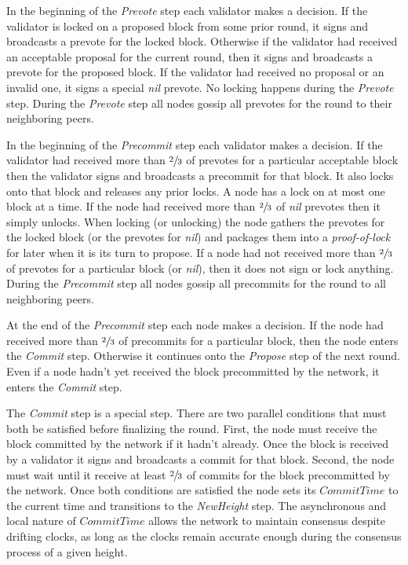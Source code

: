 \documentclass[letter,11pt]{article}
\begin{document}
In the beginning of the \textit{Prevote} step each validator makes a decision. If the validator is locked on a proposed block from some prior round, it signs and broadcasts a prevote for the locked block. Otherwise if the validator had received an acceptable proposal for the current round, then it signs and broadcasts a prevote for the proposed block. If the validator had received no proposal or an invalid one, it signs a special \textit{nil} prevote. No locking happens during the \textit{Prevote} step. During the \textit{Prevote} step all nodes gossip all prevotes for the round to their neighboring peers.

In the beginning of the \textit{Precommit} step each validator makes a decision. If the validator had received more than $\sfrac{2}{3}$ of prevotes for a particular acceptable block then the validator signs and broadcasts a precommit for that block. It also locks onto that block and releases any prior locks. A node has a lock on at most one block at a time. If the node had received more than $\sfrac{2}{3}$ of \textit{nil} prevotes then it simply unlocks. When locking (or unlocking) the node gathers the prevotes for the locked block (or the prevotes for \textit{nil}) and packages them into a \textit{proof-of-lock} for later when it is its turn to propose. If a node had not received more than $\sfrac{2}{3}$ of prevotes for a particular block (or \textit{nil}), then it does not sign or lock anything. During the \textit{Precommit} step all nodes gossip all precommits for the round to all neighboring peers.

At the end of the \textit{Precommit} step each node makes a decision. If the node had received more than $\sfrac{2}{3}$ of precommits for a particular block, then the node enters the \textit{Commit} step. Otherwise it continues onto the \textit{Propose} step of the next round. Even if a node hadn’t yet received the block precommitted by the network, it enters the \textit{Commit} step.

The \textit{Commit} step is a special step. There are two parallel conditions that must both be satisfied before finalizing the round. First, the node must receive the block committed by the network if it hadn’t already. Once the block is received by a validator it signs and broadcasts a commit for that block. Second, the node must wait until it receive at least $\sfrac{2}{3}$ of commits for the block precommitted by the network. Once both conditions are satisfied the node sets its $CommitTime$ to the current time and transitions to the \textit{NewHeight} step. The asynchronous and local nature of $CommitTime$ allows the network to maintain consensus despite drifting clocks, as long as the clocks remain accurate enough during the consensus process of a given height.
\end{document}
